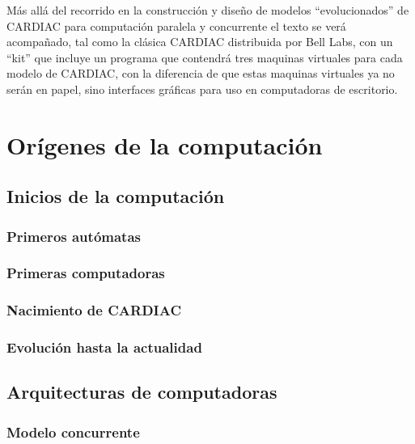 \documentclass[letterpaper,12pt,oneside]{book}
\begin{document}
	
	Más allá del recorrido en la construcción y diseño de modelos ``evolucionados'' de CARDIAC para computación paralela y concurrente el texto se verá acompañado,
	tal como la clásica CARDIAC distribuida por Bell Labs, con un ``kit'' que incluye un programa que contendrá tres maquinas virtuales para cada
	modelo de CARDIAC, con la diferencia de que estas maquinas virtuales ya no serán en papel, sino interfaces gráficas para uso en computadoras de escritorio.



\tableofcontents
\listoffigures

\mainmatter

\chapter{Orígenes de la computación} %


\section{Inicios de la computación}
	\subsection{Primeros autómatas}
	\subsection{Primeras computadoras}
	\subsection{Nacimiento de CARDIAC}
	\subsection{Evolución hasta la actualidad}
   
\section{Arquitecturas de computadoras}   
   
\subsection{Modelo concurrente}
\end{document}
